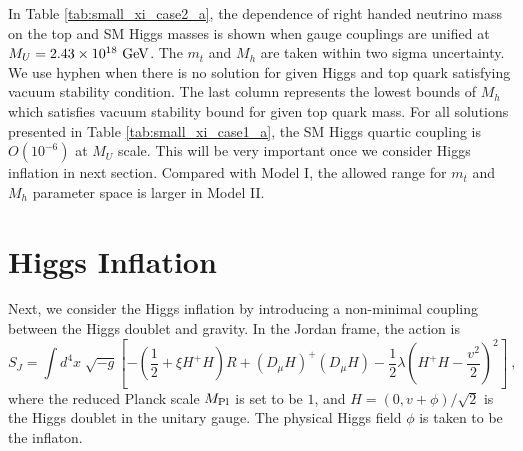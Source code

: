 \documentclass[aps,prd,preprint,superscriptaddress,showpacs,ctexart]{revtex4-1}
\begin{document}
{In Table \ref{tab:small_xi_case2_a}, the dependence of right handed neutrino mass on the top and SM Higgs masses is shown when gauge couplings are unified at $M_{U}=2.43\times10^{18}~{\rm GeV}$. The $m_{t}$ and $M_{h}$ are taken within two sigma uncertainty. We use hyphen when there is no solution for given Higgs and top quark satisfying vacuum stability condition. The last column represents the lowest  bounds of $M_{h}$ which satisfies vacuum stability bound for given top quark mass. For all solutions presented in Table \ref{tab:small_xi_case1_a}, the SM Higgs quartic coupling is $O(10^{-6})$ at $M_U$ scale. This will be very important once we consider Higgs inflation in next section.  Compared with Model
I, the allowed range for  $m_{t}$ and $M_{h}$ parameter space is larger in Model II.}

\section{Higgs Inflation}

{}Next, we consider the Higgs inflation by introducing a non-minimal
coupling between the Higgs doublet and gravity. In the Jordan frame,
the action is
\begin{equation}
S_{J}=\int d^{4}x\;\sqrt{-g}\left[-(\frac{1}{2}+\xi H^{+}H)R+(D_{\mu}H)^{+}(D_{\mu}H)-\frac{1}{2}\lambda(H^{+}H-\frac{v^{2}}{2})^{2}\right]~,~\,\label{S}
\end{equation}
where the reduced Planck scale $M_{{\rm Pl}}$ is set to be $1$,
and $H=(0,v+\phi)/\sqrt{2}$ is the Higgs doublet in the unitary gauge.
The physical Higgs field $\phi$ is taken to be the inflaton.
\end{document}
